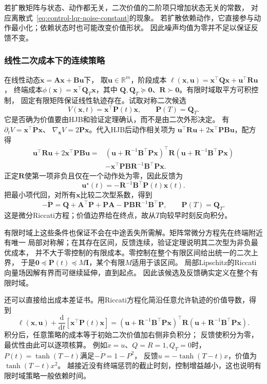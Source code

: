 若扩散矩阵与状态、动作都无关，二次价值的二阶项只增加状态无关的常数，
对应离散式~\eqref{eq:control-lqr-noise-constant}的现象。
若扩散依赖动作，它直接参与动作最小化；依赖状态时也可能改变价值形状。
因此噪声均值为零并不足以保证反馈不变。

\subsubsection{线性二次成本下的连续策略}

在线性动态$\dot{\bm x}=\bm A\bm x+\bm B\bm u$下，
取$\bm u\in\mathbb R^m$，阶段成本
$\ell(\bm x,\bm u)=\bm x^\top\bm Q\bm x+\bm u^\top\bm R\bm u$，
终端成本$\phi(\bm x)=\bm x^\top\bm Q_T\bm x$，其中
$\bm Q,\bm Q_T\succeq\bm0$、$\bm R\succ\bm0$。有限时域取平方可积控制，
固定有限矩阵保证线性轨迹存在。试取对称二次候选
\[
  V(\bm x,t)=\bm x^\top\bm P(t)\bm x,\qquad \bm P(T)=\bm Q_T.
\]
它是否确为价值要由HJB和验证定理确认，而不是由二次外形决定。
有
$\partial_tV=\bm x^\top\dot{\bm P}\bm x$、
$\nabla_{\bm x}V=2\bm P\bm x$。代入HJB后动作相关项为
$\bm u^\top\bm R\bm u+2\bm x^\top\bm P\bm B\bm u$，配方得
\begin{align*}
  \bm u^\top\bm R\bm u+2\bm x^\top\bm P\bm B\bm u
  ={}&
  (\bm u+\bm R^{-1}\bm B^\top\bm P\bm x)^\top
    \bm R(\bm u+\bm R^{-1}\bm B^\top\bm P\bm x)\\
  &-\bm x^\top\bm P\bm B\bm R^{-1}\bm B^\top\bm P\bm x.
\end{align*}
正定$\bm R$使第一项非负且仅在一个动作处为零，因此反馈为
\begin{equation}
  \bm u^\star(t)=-\bm R^{-1}\bm B^\top\bm P(t)\bm x(t).
  \label{eq:control-continuous-lqr-gain}
\end{equation}
把最小项代回，对所有$\bm x$比较二次型系数，得到
\begin{equation}
  -\dot{\bm P}
  =\bm Q+\bm A^\top\bm P+\bm P\bm A
    -\bm P\bm B\bm R^{-1}\bm B^\top\bm P,\qquad
  \bm P(T)=\bm Q_T.
  \label{eq:control-continuous-riccati}
\end{equation}
这是微分Riccati方程；价值边界给在终点，故从$T$向较早时刻反向积分。

有限时域上这些条件也保证不会在中途丢失所需解。矩阵常微分方程先在终端附近有唯一
局部对称解；在其存在区间，反馈连续，验证定理说明其二次型为非负最优成本，
并不大于零控制的有限成本。零控制在整个有限区间给出统一的二次上界，
于是$\bm0\preceq\bm P(t)\preceq M\bm I$，某个有限$M$适用于该区间。
局部Lipschitz的Riccati向量场因解有界而可继续延伸，直到起点。
因此该候选及反馈确实定义在整个有限时域。

还可以直接给出成本差证书。用Riccati方程化简沿任意允许轨迹的价值导数，得到
\[
  \ell(\bm x,\bm u)+\frac{\mathrm d}{\mathrm dt}
    [\bm x^\top\bm P(t)\bm x]
  =
  (\bm u+\bm R^{-1}\bm B^\top\bm P\bm x)^\top
    \bm R(\bm u+\bm R^{-1}\bm B^\top\bm P\bm x).
\]
积分后，任意策略的成本等于初始二次价值加右侧非负积分；
反馈使积分为零，最优性由此可以逐项核算。
例如$\dot x=u$、$Q=R=1,Q_T=0$时，
$P(t)=\tanh(T-t)$满足$-\dot P=1-P^2$，
反馈$u=-\tanh(T-t)x$，价值为$\tanh(T-t)x^2$。
越接近没有终端惩罚的截止时刻，控制增益越小，这也说明有限时域策略一般依赖时间。

